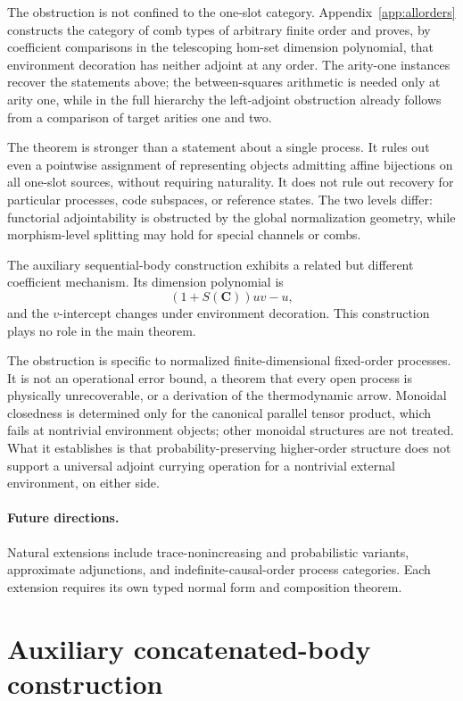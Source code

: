 \documentclass[11pt,a4paper]{article}
\theoremstyle{definition}
\theoremstyle{plain}
\theoremstyle{remark}
\begin{document}
The obstruction is not confined to the one-slot category.
Appendix~\ref{app:allorders} constructs the category of comb types of
arbitrary finite order and proves, by coefficient comparisons in the
telescoping hom-set dimension polynomial, that environment decoration
has neither adjoint at any order. The arity-one instances recover the
statements above; the between-squares arithmetic is needed only at
arity one, while in the full hierarchy the left-adjoint obstruction
already follows from a comparison of target arities one and two.

The theorem is stronger than a statement about a single process. It
rules out even a pointwise assignment of representing objects admitting
affine bijections on all one-slot sources, without requiring naturality.
It does not rule out recovery for particular processes, code subspaces,
or reference states. The two levels differ: functorial adjointability is obstructed by
the global normalization geometry, while morphism-level splitting may hold for
special channels or combs.

The auxiliary sequential-body construction exhibits a related but
different coefficient mechanism. Its dimension polynomial is
\[
(1+S(\mathbf C))uv-u,
\]
and the $v$-intercept changes under environment decoration. This
construction plays no role in the main theorem.

The obstruction is specific to normalized finite-dimensional
fixed-order processes. It is not an operational error bound, a theorem
that every open process is physically unrecoverable, or a derivation of
the thermodynamic arrow. Monoidal closedness is determined only for the
canonical parallel tensor product, which fails at nontrivial environment
objects; other monoidal structures are not treated. What it establishes
is that probability-preserving higher-order structure does not support a
universal adjoint currying operation for a nontrivial external
environment, on either side.

\paragraph{Future directions.}
Natural extensions include trace-nonincreasing and probabilistic
variants, approximate adjunctions, and indefinite-causal-order process
categories. Each extension requires its own typed normal form and
composition theorem.

\appendix

\section{Auxiliary concatenated-body construction}
\label{app:seqbody}
\end{document}

